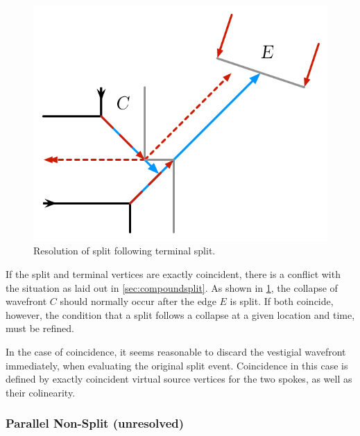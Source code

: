 \documentclass[12pt,a4paper,oneside,openany]{article}
\begin{document}
\begin{figure}[htpb]
\begin{center}
\includegraphics[scale=0.6667]{fig-terminal-split3.pdf}
\caption{Resolution of split following terminal split.}
\label{fig:terminalsplit:order}
\end{center}
\end{figure}

If the split and terminal vertices are exactly coincident, there is a conflict with the situation as laid out in \cref{sec:compoundsplit}. As shown in \cref{fig:terminalsplit:order}, the collapse of wavefront $C$ should normally occur after the edge $E$ is split. If both coincide, however, the condition that a split follows a collapse at a given location and time, must be refined.

In the case of coincidence, it seems reasonable to discard the vestigial wavefront immediately, when evaluating the original split event. Coincidence in this case is defined by exactly coincident virtual source vertices for the two spokes, as well as their colinearity.

 
\subsubsection{Parallel Non-Split (unresolved)}
\end{document}
